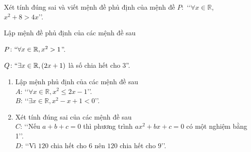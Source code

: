 \begin{bt}%
	Xét tính đúng sai và viết mệnh đề phủ định của mệnh đề $P\colon $  \lq\lq $\forall x \in \mathbb{R}$, $x^2+8>4 x$\rq\rq.
\end{bt}

\begin{bt}%
	Lập mệnh đề phủ định của các mệnh đề sau
	\begin{listEX}[1]
		\item $P\colon``\forall x \in \mathbb{R}, x^2>1$''.
		\item $Q\colon``\exists x \in \mathbb{R}, (2x+1)$ là số chia hết cho $3$''.
	\end{listEX}
\end{bt}

\begin{bt}%
	\begin{enumerate}
		\item Lập mệnh phủ định của các mệnh đề sau\\
		$A$: \lq\lq$\forall x\in\mathbb{R},x^2\leq 2x-1$\rq\rq.\\
		$B$: \lq\lq$\exists x\in\mathbb{R},x^2-x+1<0$\rq\rq.
		\item Xét tính đúng sai của các mệnh đề sau\\
		$C$: \lq\lq Nếu $a+b+c=0$ thì phương trình $ax^2+bx+c=0$ có một nghiệm bằng 1\rq\rq.\\
		$D$: \lq\lq Vì $120$ chia hết cho $6$ nên $120$ chia hết cho $9$\rq\rq.
	\end{enumerate}
\end{bt}

